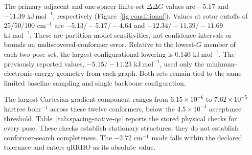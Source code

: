 \documentclass[11pt]{article}
\newcommand{\kj}{\ensuremath{\mathrm{kJ\,mol^{-1}}}}
\begin{document}
The primary adjacent and one-spacer finite-set $\Delta\Delta G$ values are $-5.17$ and $-11.39$ \kj, respectively (Figure~\ref{fig:conditional}). Values at rotor cutoffs of 25/50/100 cm$^{-1}$ are $-5.13/-5.17/-4.64$ and $-12.34/-11.39/-11.69$ \kj. These are partition-model sensitivities, not confidence intervals or bounds on undiscovered-conformer error. Relative to the lowest-$G$ member of each two-pose set, the largest configurational lowering is 0.140 \kj. The previously reported values, $-5.15/-11.23$ \kj, used only the minimum-electronic-energy geometry from each graph. Both sets remain tied to the same limited baseline sampling and single backbone configuration.


The largest Cartesian gradient component ranges from $6.15\times10^{-6}$ to $7.62\times10^{-5}$ hartree bohr$^{-1}$ across these twelve conformers, below the $4.5\times10^{-4}$ acceptance threshold. Table~\ref{tab:spacing-native-qc} reports the stored physical checks for every pose. These checks establish stationary structures; they do not establish conformer-search completeness. The $-2.72$ cm$^{-1}$ mode falls within the declared tolerance and enters qRRHO as its absolute value.
\end{document}
